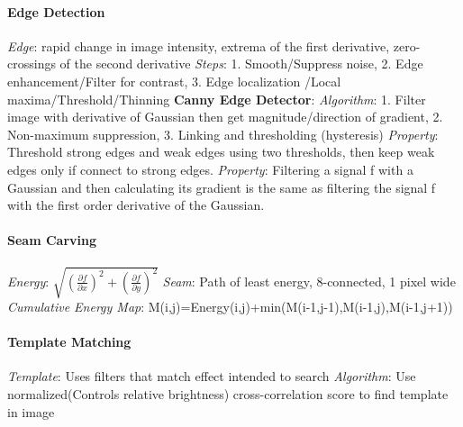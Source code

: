 \documentclass{article}
\begin{document}
\begin{multicols*}{2}
        \paragraph*{Edge Detection}
        \textit{Edge}: rapid change in image intensity, extrema of the first derivative, zero-crossings of the second
        derivative\newline
        \textit{Steps}: 1. Smooth/Suppress noise, 2. Edge enhancement/Filter for contrast, 3. Edge localization
        /Local maxima/Threshold/Thinning\newline
        \textbf{Canny Edge Detector}:\newline
        \textit{Algorithm}: 1. Filter image with derivative of Gaussian then get
        magnitude/direction of gradient, 2. Non-maximum suppression, 3. Linking and thresholding (hysteresis)\newline
        \textit{Property}: Threshold strong edges and weak edges using two thresholds, then keep weak edges only if
        connect to strong edges.\newline
        \textit{Property}: Filtering a signal f with a Gaussian and then calculating its gradient is the same as
        filtering the signal f with the first order derivative of the Gaussian.
        \paragraph*{Seam Carving}
        \textit{Energy}: $\sqrt {\left(\frac{\partial f}{\partial x}\right)^2 +
        \left(\frac{\partial f}{\partial y}\right)^2}$\newline
        \textit{Seam}: Path of least energy, 8-connected, 1 pixel wide\newline
        \textit{Cumulative Energy Map}: M(i,j)=Energy(i,j)+min(M(i-1,j-1),M(i-1,j),M(i-1,j+1))
        \paragraph*{Template Matching}
        \textit{Template}: Uses filters that match effect intended to search\newline
        \textit{Algorithm}: Use normalized(Controls relative brightness) cross-correlation score to find template in
        image

\end{multicols*}
\end{document}
